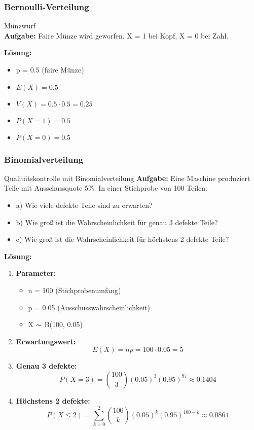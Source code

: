 \subsubsection{Bernoulli-Verteilung}

\begin{example2}{Münzwurf}\\
\textbf{Aufgabe:} Faire Münze wird geworfen. X = 1 bei Kopf, X = 0 bei Zahl.

\textbf{Lösung:}
\begin{itemize}
\item p = 0.5 (faire Münze)
\item $E(X) = 0.5$
\item $V(X) = 0.5 \cdot 0.5 = 0.25$
\item $P(X=1) = 0.5$
\item $P(X=0) = 0.5$
\end{itemize}
\end{example2}

\subsubsection{Binomialverteilung}

\begin{example2}{Qualitätskontrolle mit Binomialverteilung}
\textbf{Aufgabe:} Eine Maschine produziert Teile mit Ausschussquote 5\%. In einer Stichprobe von 100 Teilen:
\begin{itemize}
\item a) Wie viele defekte Teile sind zu erwarten?
\item b) Wie groß ist die Wahrscheinlichkeit für genau 3 defekte Teile?
\item c) Wie groß ist die Wahrscheinlichkeit für höchstens 2 defekte Teile?
\end{itemize}

\textbf{Lösung:}
\begin{enumerate}
\item \textbf{Parameter:}
   \begin{itemize}
   \item n = 100 (Stichprobenumfang)
   \item p = 0.05 (Ausschusswahrscheinlichkeit)
   \item X $\thicksim$ B(100, 0.05)
   \end{itemize}

\item \textbf{Erwartungswert:}
   $$E(X) = np = 100 \cdot 0.05 = 5$$

\item \textbf{Genau 3 defekte:}
   $$P(X=3) = \binom{100}{3}(0.05)^3(0.95)^{97} \approx 0.1404$$

\item \textbf{Höchstens 2 defekte:}
   $$P(X \leq 2) = \sum_{k=0}^2 \binom{100}{k}(0.05)^k(0.95)^{100-k} \approx 0.0861$$
\end{enumerate}
\end{example2}

